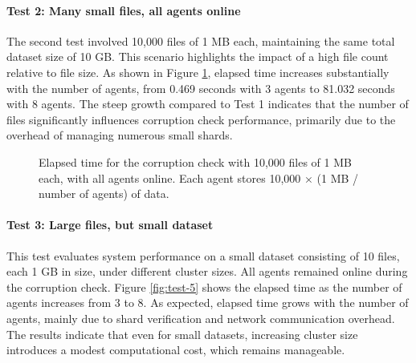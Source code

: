 \newpage
\paragraph{Test 2: Many small files, all agents online}

The second test involved 10,000 files of 1 MB each, maintaining the same total
dataset size of 10 GB. This scenario highlights the impact of a high file count
relative to file size. As shown in Figure \ref{fig:test-2}, elapsed time
increases substantially with the number of agents, from 0.469 seconds with 3
agents to 81.032 seconds with 8 agents. The steep growth compared to Test 1
indicates that the number of files significantly influences corruption check
performance, primarily due to the overhead of managing numerous small shards.

\begin{figure}[!ht]
\centering
{}
\caption{Elapsed time for the corruption check with 10,000 files of 1 MB each,
    with all agents online. Each agent stores 10,000 $\times$ (1 MB / number of agents) of data.}
\label{fig:test-2}
\end{figure}

\newpage
\paragraph{Test 3: Large files, but small dataset}

This test evaluates system performance on a small dataset consisting of 10 files, each 1 GB in size, under different cluster sizes. All agents remained online during the corruption check. Figure \ref{fig:test-5} shows the elapsed time as the number of agents increases from 3 to 8. As expected, elapsed time grows with the number of agents, mainly due to shard verification and network communication overhead. The results indicate that even for small datasets, increasing cluster size introduces a modest computational cost, which remains manageable.

